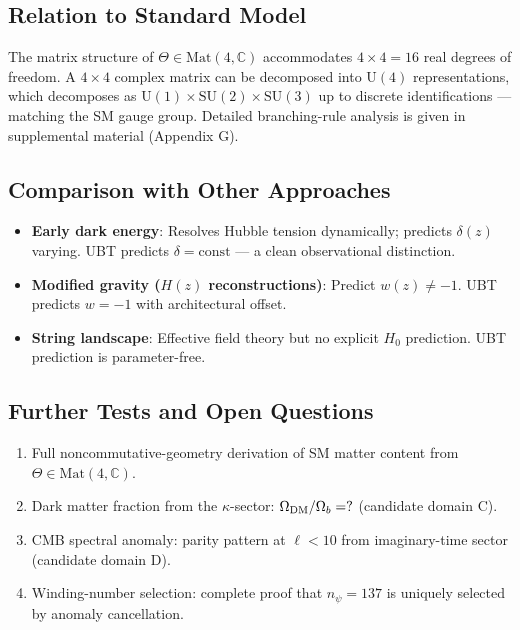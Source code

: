 \documentclass[12pt,a4paper]{article}
\newcommand{\C}{\mathbb{C}}
\begin{document}
\subsection{Relation to Standard Model}

The matrix structure of $\Theta\in\mathrm{Mat}(4,\C)$ accommodates
$4\times 4 = 16$ real degrees of freedom.
A $4\times 4$ complex matrix can be decomposed into $\mathrm{U}(4)$ representations,
which decomposes as $\mathrm{U}(1)\times\mathrm{SU}(2)\times\mathrm{SU}(3)$
up to discrete identifications — matching the SM gauge group.
Detailed branching-rule analysis is given in supplemental material (Appendix G).

\subsection{Comparison with Other Approaches}

\begin{itemize}
  \item \textbf{Early dark energy}: Resolves Hubble tension dynamically;
        predicts $\delta(z)$ varying. UBT predicts $\delta = \mathrm{const}$
        — a clean observational distinction.
  \item \textbf{Modified gravity ($H(z)$ reconstructions)}: Predict
        $w(z)\neq -1$. UBT predicts $w=-1$ with architectural offset.
  \item \textbf{String landscape}: Effective field theory but no explicit
        $H_0$ prediction. UBT prediction is parameter-free.
\end{itemize}

\subsection{Further Tests and Open Questions}

\begin{enumerate}
  \item Full noncommutative-geometry derivation of SM matter content from
        $\Theta\in\mathrm{Mat}(4,\C)$.
  \item Dark matter fraction from the $\kappa$-sector:
        $\Omega_{\rm DM}/\Omega_b = ?$ (candidate domain C).
  \item CMB spectral anomaly: parity pattern at $\ell < 10$ from imaginary-time
        sector (candidate domain D).
  \item Winding-number selection: complete proof that $n_\psi = 137$ is
        uniquely selected by anomaly cancellation.
\end{enumerate}
\end{document}

